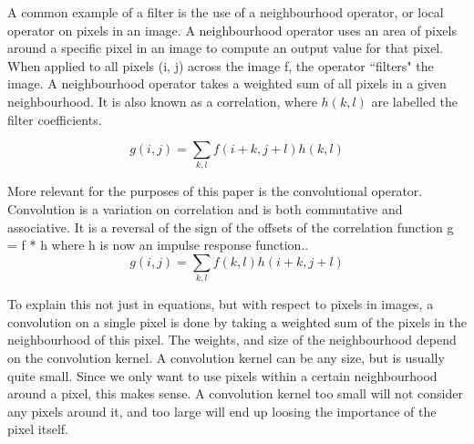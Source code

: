 \documentclass[12pt]{report} %
\begin{document}
	A common example of a filter is the use of a neighbourhood operator, or local operator on pixels in an image. A neighbourhood operator uses an area of pixels around a specific pixel in an image to compute an output value for that pixel. When applied to all pixels (i, j) across the image f, the operator ``filters" the image. A neighbourhood operator takes a weighted sum of all pixels in a given neighbourhood. It is also known as a correlation, where $h(k, l)$ are labelled the filter coefficients\cite{szeliski2010computer}.
	
\begin{equation}
g(i,j) = \sum_{k,l} f(i+k,j+l)h(k,l)
\end{equation}
	
	More relevant for the purposes of this paper is the convolutional operator. Convolution is a variation on correlation and is both commutative and associative. It is a reversal of the sign of the offsets of the correlation function  g = f * h where h is now an impulse response function.\cite{szeliski2010computer}. 
\begin{equation}
g(i,j) = \sum_{k,l} f(k, l)h(i + k, j + l)
\end{equation}

	To explain this not just in equations, but with respect to pixels in images, a convolution on a single pixel is done by taking a weighted sum of the pixels in the neighbourhood of this pixel. The weights, and size of the neighbourhood depend on the convolution kernel\cite{RiverTrail}. A convolution kernel can be any size, but is usually quite small. Since we only want to use pixels within a certain neighbourhood around a pixel, this makes sense. A convolution kernel too small will not consider any pixels around it, and too large will end up loosing the importance of the pixel itself. 
	
\end{document}

